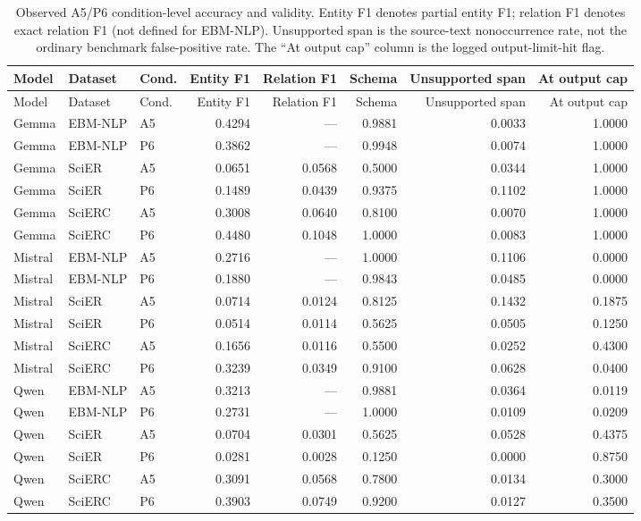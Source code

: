 \documentclass[fleqn,10pt]{wlscirep-authoryear}
\begin{document}
\begingroup
\footnotesize
\setlength{\tabcolsep}{4pt}
\setlength{\LTleft}{0pt}
\setlength{\LTright}{0pt}
\begin{longtable}{lllrrrrr}
\caption{Observed A5/P6 condition-level accuracy and validity. Entity F1 denotes partial entity F1; relation F1 denotes exact relation F1 (not defined for EBM-NLP). Unsupported span is the source-text nonoccurrence rate, not the ordinary benchmark false-positive rate. The ``At output cap'' column is the logged output-limit-hit flag.}\label{tab:r1-condition-quality}\\
\toprule
Model & Dataset & Cond. & Entity F1 & Relation F1 & Schema & Unsupported span & At output cap \\
\midrule
\endfirsthead
\toprule
Model & Dataset & Cond. & Entity F1 & Relation F1 & Schema & Unsupported span & At output cap \\
\midrule
\endhead
\bottomrule
\endfoot
Gemma & EBM-NLP & A5 & 0.4294 & --- & 0.9881 & 0.0033 & 1.0000 \\
Gemma & EBM-NLP & P6 & 0.3862 & --- & 0.9948 & 0.0074 & 1.0000 \\
\addlinespace[2pt]
Gemma & SciER & A5 & 0.0651 & 0.0568 & 0.5000 & 0.0344 & 1.0000 \\
Gemma & SciER & P6 & 0.1489 & 0.0439 & 0.9375 & 0.1102 & 1.0000 \\
\addlinespace[2pt]
Gemma & SciERC & A5 & 0.3008 & 0.0640 & 0.8100 & 0.0070 & 1.0000 \\
Gemma & SciERC & P6 & 0.4480 & 0.1048 & 1.0000 & 0.0083 & 1.0000 \\
\addlinespace[2pt]
Mistral & EBM-NLP & A5 & 0.2716 & --- & 1.0000 & 0.1106 & 0.0000 \\
Mistral & EBM-NLP & P6 & 0.1880 & --- & 0.9843 & 0.0485 & 0.0000 \\
\addlinespace[2pt]
Mistral & SciER & A5 & 0.0714 & 0.0124 & 0.8125 & 0.1432 & 0.1875 \\
Mistral & SciER & P6 & 0.0514 & 0.0114 & 0.5625 & 0.0505 & 0.1250 \\
\addlinespace[2pt]
Mistral & SciERC & A5 & 0.1656 & 0.0116 & 0.5500 & 0.0252 & 0.4300 \\
Mistral & SciERC & P6 & 0.3239 & 0.0349 & 0.9100 & 0.0628 & 0.0400 \\
\addlinespace[2pt]
Qwen & EBM-NLP & A5 & 0.3213 & --- & 0.9881 & 0.0364 & 0.0119 \\
Qwen & EBM-NLP & P6 & 0.2731 & --- & 1.0000 & 0.0109 & 0.0209 \\
\addlinespace[2pt]
Qwen & SciER & A5 & 0.0704 & 0.0301 & 0.5625 & 0.0528 & 0.4375 \\
Qwen & SciER & P6 & 0.0281 & 0.0028 & 0.1250 & 0.0000 & 0.8750 \\
\addlinespace[2pt]
Qwen & SciERC & A5 & 0.3091 & 0.0568 & 0.7800 & 0.0134 & 0.3000 \\
Qwen & SciERC & P6 & 0.3903 & 0.0749 & 0.9200 & 0.0127 & 0.3500 \\
\end{longtable}
\endgroup
\end{document}
